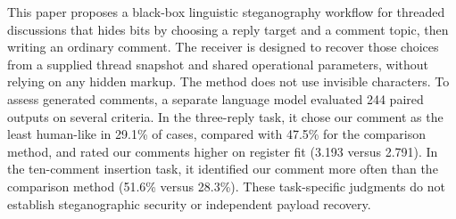 This paper proposes a black-box linguistic steganography workflow for threaded discussions that hides bits by choosing a reply target and a comment topic, then writing an ordinary comment.
The receiver is designed to recover those choices from a supplied thread snapshot and shared operational parameters, without relying on any hidden markup.
The method does not use invisible characters.
To assess generated comments, a separate language model evaluated 244 paired outputs on several criteria.
In the three-reply task, it chose our comment as the least human-like in 29.1\% of cases, compared with 47.5\% for the comparison method, and rated our comments higher on register fit (3.193 versus 2.791).
In the ten-comment insertion task, it identified our comment more often than the comparison method (51.6\% versus 28.3\%).
These task-specific judgments do not establish steganographic security or independent payload recovery.
